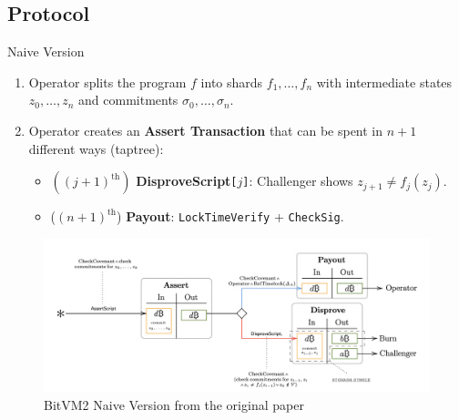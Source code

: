\documentclass{zkdl-presentation-template}
\begin{document}
    \subsection{Protocol}
      \begin{frame}{Naive Version}  
        \begin{enumerate}
            \item Operator splits the program $f$ into shards $f_1,\dots,f_n$ with intermediate states $z_0,\dots,z_n$ and commitments $\sigma_0,\dots,\sigma_n$. 
            \item Operator creates an \textbf{Assert Transaction} that can be spent in $n+1$ different ways (taptree):
            \begin{itemize}[label={}]
                \item $((j+1)^{\text{th}})$ \hspace{1px} \textbf{DisproveScript}\texttt{[}$j$\texttt{]}: Challenger shows $z_{j+1} \neq f_j(z_j)$.
                \item ($(n+1)^{\text{th}}$) \hspace{1px} \textbf{Payout}: \texttt{LockTimeVerify} + \texttt{CheckSig}.
            \end{itemize}
        \end{enumerate}

        \begin{figure}
            \centering
            \includegraphics[width=0.95\linewidth]{images/bitvm_basic_structure.png}
            \caption{BitVM2 Naive Version from the original paper}
            \label{fig:bitvm2_naive}
        \end{figure}
      \end{frame}
\end{document}
